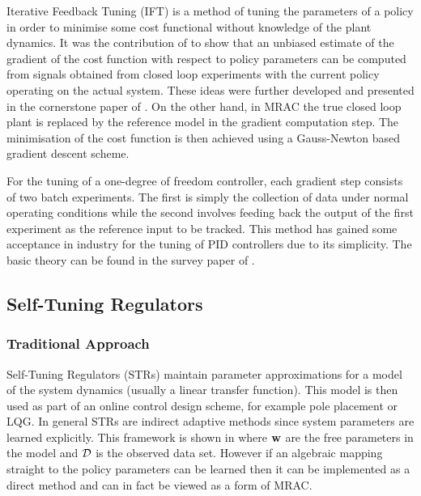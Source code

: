 Iterative Feedback Tuning (IFT) is a method of tuning the parameters of a policy in order to minimise some cost functional without knowledge of the plant dynamics. It was the contribution of \cite{HGG94} to show that an unbiased estimate of the gradient of the cost function with respect to policy parameters can be computed from signals obtained from closed loop experiments with the current policy operating on the actual system. These ideas were further developed and presented in the cornerstone paper of \cite{HGGL98}. On the other hand, in MRAC the true closed loop plant is replaced by the reference model in the gradient computation step. The minimisation of the cost function is then achieved using a Gauss-Newton based gradient descent scheme.

For the tuning of a one-degree of freedom controller, each gradient step consists of two batch experiments. The first is simply the collection of data under normal operating conditions while the second involves feeding back the output of the first experiment as the reference input to be tracked. This method has gained some acceptance in industry for the tuning of PID controllers due to its simplicity. The basic theory can be found in the survey paper of \cite{Hja02}.





\subsection{Self-Tuning Regulators}
\subsubsection{Traditional Approach}
Self-Tuning Regulators (STRs) maintain parameter approximations for a model of the system dynamics (usually a linear transfer function). This model is then used as part of an online control design scheme, for example pole placement or LQG. In general STRs are indirect adaptive methods since system parameters are learned explicitly. This framework is shown in  where $\mathbf{w}$ are the free parameters in the model and $\mathcal{D}$ is the observed data set. However if an algebraic mapping straight to the policy parameters can be learned then it can be implemented as a direct method and can in fact be viewed as a form of MRAC.




